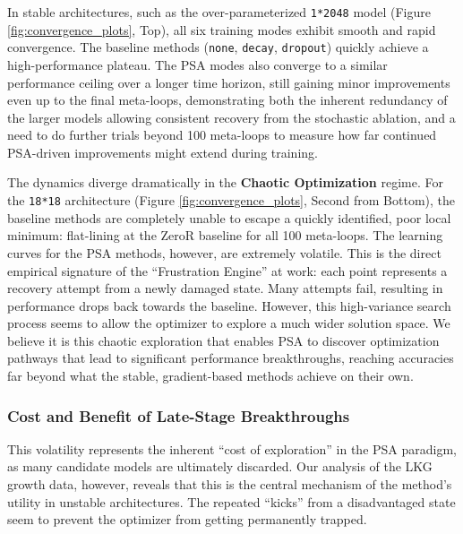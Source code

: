 \documentclass[conference]{IEEEtran}
\begin{document}
In stable architectures, such as the over-parameterized \texttt{1*2048} model (Figure \ref{fig:convergence_plots}, Top), all six training modes exhibit smooth and rapid convergence. The baseline methods (\verb|none|, \verb|decay|, \verb|dropout|) quickly achieve a high-performance plateau. The PSA modes also converge to a similar performance ceiling over a longer time horizon, still gaining minor improvements even up to the final meta-loops, demonstrating both the inherent redundancy of the larger models allowing consistent recovery from the stochastic ablation, and a need to do further trials beyond 100 meta-loops to measure how far continued PSA-driven improvements might extend during training.

The dynamics diverge dramatically in the \textbf{Chaotic Optimization} regime. For the \texttt{18*18} architecture (Figure \ref{fig:convergence_plots}, Second from Bottom), the baseline methods are completely unable to escape a quickly identified, poor local minimum: flat-lining at the ZeroR baseline for all 100 meta-loops. The learning curves for the PSA methods, however, are extremely volatile. This is the direct empirical signature of the ``Frustration Engine'' at work: each point represents a recovery attempt from a newly damaged state. Many attempts fail, resulting in performance drops back towards the baseline. However, this high-variance search process seems to allow the optimizer to explore a much wider solution space. We believe it is this chaotic exploration that enables PSA to discover optimization pathways that lead to significant performance breakthroughs, reaching accuracies far beyond what the stable, gradient-based methods achieve on their own.

\subsubsection{Cost and Benefit of Late-Stage Breakthroughs}

This volatility represents the inherent ``cost of exploration'' in the PSA paradigm, as many candidate models are ultimately discarded. Our analysis of the LKG growth data, however, reveals that this is the central mechanism of the method's utility in unstable architectures. The repeated ``kicks'' from a disadvantaged state seem to prevent the optimizer from getting permanently trapped.
\end{document}
